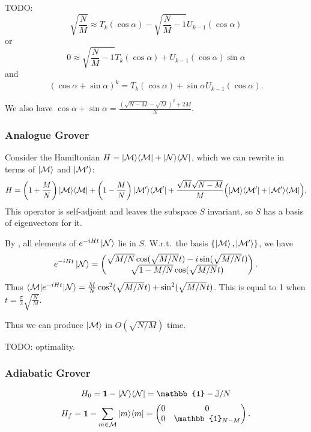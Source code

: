 TODO:
\[ \sqrt{\frac{N}{M}} \approx T_k(\cos\alpha) - \sqrt{\frac{N}{M} - 1}U_{k-1}(\cos\alpha) \]
or
\[ 0 \approx \sqrt{\frac{N}{M}-1}T_k(\cos\alpha) + U_{k-1}(\cos\alpha)\sin\alpha \]
and
\[ (\cos\alpha + \sin\alpha)^k = T_k(\cos\alpha) + \sin\alpha U_{k-1}(\cos\alpha). \]

We also have $\cos\alpha + \sin\alpha = \frac{(\sqrt{N-M}-\sqrt{M})^2+2M}{N}$.

\subsubsection{Analogue Grover}
Consider the Hamiltonian $H = |\mathcal{M}\rangle\langle\mathcal{M}| + |\mathcal{N}\rangle\langle\mathcal{N}|$, which we can rewrite in terms of $\left| \mathcal{M} \right\rangle$ and $\left| \mathcal{M}' \right\rangle$:
\[ H = \left(1 + \frac{M}{N}\right)|\mathcal{M}\rangle\langle\mathcal{M}| + \left(1 - \frac{M}{N}\right)|\mathcal{M}'\rangle\langle\mathcal{M}'| + \frac{\sqrt{M}\sqrt{N-M}}{M}\Big(|\mathcal{M}\rangle\langle\mathcal{M}'|+|\mathcal{M}'\rangle\langle\mathcal{M}|\Big), \]
This operator is self-adjoint and leaves the subspace $S$ invariant, so $S$ has a basis of eigenvectors for it.

By , all elements of $e^{-iHt}\left| \mathcal{N} \right\rangle$ lie in $S$. W.r.t.\ the basis $\{\left| \mathcal{M} \right\rangle, \left| \mathcal{M}' \right\rangle\}$, we have
\[ e^{-iHt}\left| \mathcal{N} \right\rangle = \begin{pmatrix}
\sqrt{M/N}\cos(\sqrt{M/N}t) - i\sin(\sqrt{M/N}t) \\ \sqrt{1- M/N}\cos(\sqrt{M/N}t)
\end{pmatrix}. \]
Thus $\braket[e^{-iHt}]{\mathcal{M}}{\mathcal{N}} = \frac{M}{N}\cos^2(\sqrt{M/N}t) + \sin^2(\sqrt{M/N}t)$. This is equal to 1 when $t = \frac{\pi}{2}\sqrt{\frac{N}{M}}$.

Thus we can produce $\left| \mathcal{M} \right\rangle$ in $O(\sqrt{N/M})$ time.

TODO: optimality.

\subsubsection{Adiabatic Grover}
\[ H_0 = \vec{1} - \ketbra{\mathcal{N}}{\mathcal{N}} = \mathbb{1}-\mathbb{J}/N \]
\[ H_f = \vec{1} - \sum_{m\in\mathcal{M}}\ketbra{m}{m} = \begin{pmatrix}
0 & 0 \\ 0 & \mathbb{1}_{N-M}
\end{pmatrix}.\]

